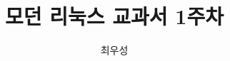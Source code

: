 \documentclass[11pt, a4paper, oneside, chapter, romanfixed]{oblivoir}
\begin{document}
\title{모던 리눅스 교과서 1주차}
\author{최우성}
\date{ }
\maketitle
\newpage


\tableofcontents




\end{document}
